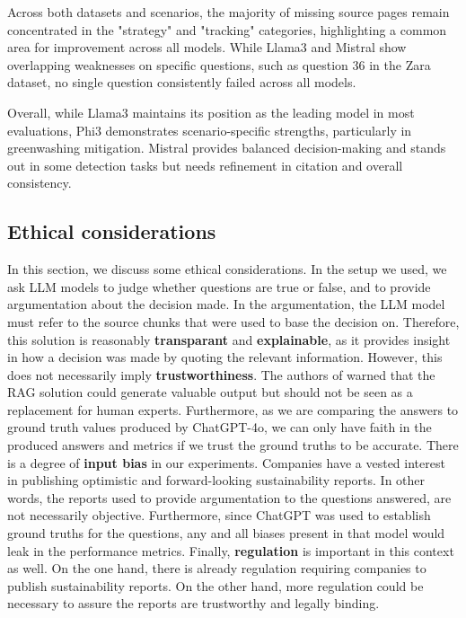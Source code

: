 \documentclass[]{article}
\begin{document}
Across both datasets and scenarios, the majority of missing source pages remain concentrated in the "strategy" and "tracking" categories, highlighting a common area for improvement across all models. 
While Llama3 and Mistral show overlapping weaknesses on specific questions, such as question 36 in the Zara dataset, no single question consistently failed across all models.

Overall, while Llama3 maintains its position as the leading model in most evaluations, Phi3 demonstrates scenario-specific strengths, particularly in greenwashing mitigation. 
Mistral provides balanced decision-making and stands out in some detection tasks but needs refinement in citation and overall consistency.  

\subsection{Ethical considerations}

In this section, we discuss some ethical considerations.
In the setup we used, we ask LLM models to judge whether questions are true or false, and to provide argumentation about the decision made.
In the argumentation, the LLM model must refer to the source chunks that were used to base the decision on.
Therefore, this solution is reasonably \textbf{transparant} and \textbf{explainable}, as it provides insight in how a decision was made by quoting the relevant information.
However, this does not necessarily imply \textbf{trustworthiness}.
The authors of \cite{durability} warned that the RAG solution could generate valuable output but should not be seen as a replacement for human experts.
Furthermore, as we are comparing the answers to ground truth values produced by ChatGPT-4o, we can only have faith in the produced answers and metrics if we trust the ground truths to be accurate.
There is a degree of \textbf{input bias} in our experiments.
Companies have a vested interest in publishing optimistic and forward-looking sustainability reports.
In other words, the reports used to provide argumentation to the questions answered, are not necessarily objective.
Furthermore, since ChatGPT was used to establish ground truths for the questions, any and all biases present in that model would leak in the performance metrics.
Finally, \textbf{regulation} is important in this context as well.
On the one hand, there is already regulation requiring companies to publish sustainability reports.
On the other hand, more regulation could be necessary to assure the reports are trustworthy and legally binding.
\end{document}
